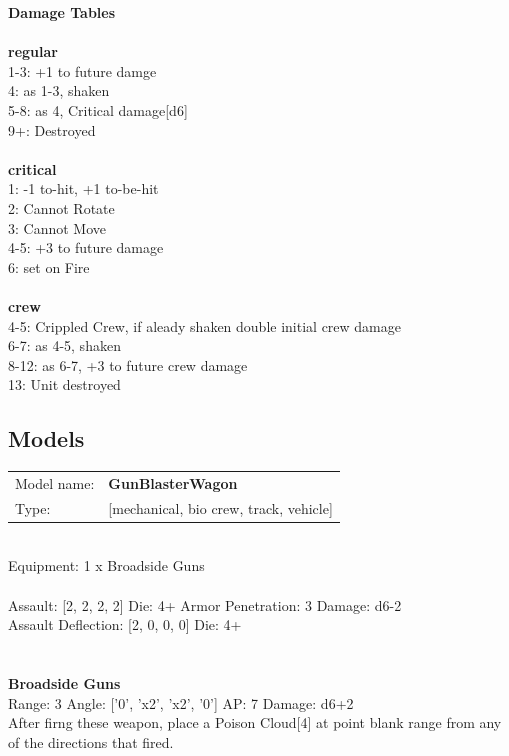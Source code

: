 {\bf Damage Tables} \\
\ \\ {\bf regular } \\
1-3: +1 to future damge \\
4: as 1-3, shaken \\
5-8: as 4, Critical damage[d6] \\
9+: Destroyed \\
\ \\ {\bf critical } \\
1: -1 to-hit, +1 to-be-hit \\
2: Cannot Rotate \\
3: Cannot Move \\
4-5: +3 to future damage \\
6: set on Fire \\
\ \\ {\bf crew } \\
4-5: Crippled Crew, if aleady shaken double initial crew damage \\
6-7: as 4-5, shaken \\
8-12: as 6-7, +3 to future crew damage \\
13: Unit destroyed \\


\clearpage

\subsection{ Models }

\begin{tabular}{ll}
Model name: & {\bf GunBlasterWagon } \\
Type: & [mechanical, bio crew, track, vehicle] \\
\end{tabular}
\ \\
Equipment: 1 x Broadside Guns \\
\ \\
Assault: [2, 2, 2, 2] Die: 4+ Armor Penetration: 3 Damage: d6-2 \\
Assault Deflection: [2, 0, 0, 0] Die: 4+\\
\indent  
\ \\

\ \\
{\bf Broadside Guns } \\



Range: 3  Angle: ['0', 'x2', 'x2', '0'] AP: 7 Damage: d6+2 \\
After firng these weapon, place a Poison Cloud[4] at point blank range from any of the directions that fired.\\ 




